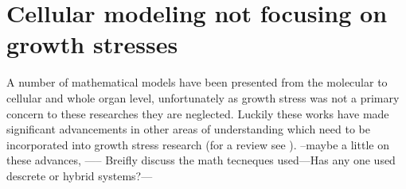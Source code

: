 \section{Cellular modeling not focusing on growth stresses}
A number of mathematical models have been presented from the
molecular to cellular and whole organ level, unfortunately as
growth stress was not a primary concern to these researches they are neglected.
Luckily these works have made significant advancements in other areas of
understanding which need to be incorporated into growth stress research (for a review see \cite{ISI:000261731700022}). --maybe
a little on these advances, ----- Breifly discuss the math
tecneques used---Has any one used descrete or hybrid systems?---
